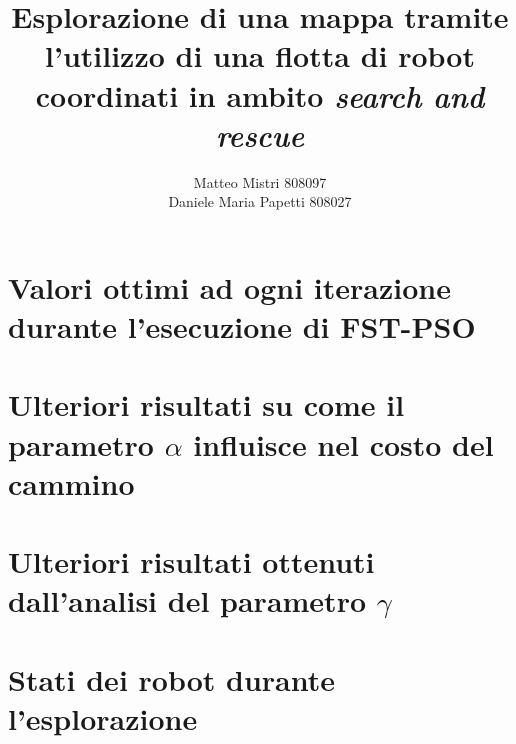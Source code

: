 \documentclass[a4paper,12pt]{report} %
\begin{document}
 

\title{Esplorazione di una mappa tramite l'utilizzo di una flotta di robot coordinati in ambito \textit{search and rescue}} 
\author{Matteo Mistri 808097\\ Daniele Maria Papetti 808027}

\maketitle
\tableofcontents








\begin{appendices}
	\chapter{Valori ottimi ad ogni iterazione durante l'esecuzione di FST-PSO}
	\label{apx:pso}
	
	\chapter{Ulteriori risultati su come il parametro $\alpha$ influisce nel costo del cammino}
	\label{apx:alpha}
	
	\chapter{Ulteriori risultati ottenuti dall'analisi del parametro $\gamma$}
	\label{apx:gamma}
	
	\chapter{Stati dei robot durante l'esplorazione}
	\label{apx:status}
	
\end{appendices}



\end{document}
